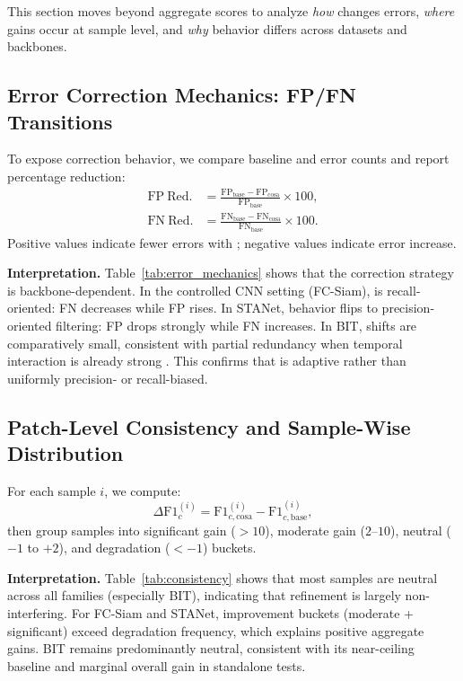 This section moves beyond aggregate scores to analyze \emph{how} \cosa{} changes errors, \emph{where} gains occur at sample level, and \emph{why} behavior differs across datasets and backbones.

\subsection{Error Correction Mechanics: FP/FN Transitions}
To expose correction behavior, we compare baseline and \cosa{} error counts and report percentage reduction:
\begin{equation}
\begin{aligned}
\mathrm{FP\ Red.}&=\frac{\mathrm{FP}_{\text{base}}-\mathrm{FP}_{\text{cosa}}}{\mathrm{FP}_{\text{base}}}\times 100,\\
\mathrm{FN\ Red.}&=\frac{\mathrm{FN}_{\text{base}}-\mathrm{FN}_{\text{cosa}}}{\mathrm{FN}_{\text{base}}}\times 100.
\end{aligned}
\end{equation}
Positive values indicate fewer errors with \cosa{}; negative values indicate error increase.



\noindent\textbf{Interpretation.} Table~\ref{tab:error_mechanics} shows that the correction strategy is backbone-dependent. In the controlled CNN setting (FC-Siam), \cosa{} is recall-oriented: FN decreases while FP rises. In STANet, behavior flips to precision-oriented filtering: FP drops strongly while FN increases. In BIT, shifts are comparatively small, consistent with partial redundancy when temporal interaction is already strong \cite{chen2022bit,w2022,wei2024}. This confirms that \cosa{} is adaptive rather than uniformly precision- or recall-biased.

\subsection{Patch-Level Consistency and Sample-Wise Distribution}
For each sample $i$, we compute:
\begin{equation}
\Delta \mathrm{F1}_c^{(i)} = \mathrm{F1}_{c,\text{cosa}}^{(i)} - \mathrm{F1}_{c,\text{base}}^{(i)},
\end{equation}
then group samples into significant gain ($>10$), moderate gain ($2$--$10$), neutral ($-1$ to $+2$), and degradation ($<-1$) buckets.



\noindent\textbf{Interpretation.} Table~\ref{tab:consistency} shows that most samples are neutral across all families (especially BIT), indicating that refinement is largely non-interfering. For FC-Siam and STANet, improvement buckets (moderate + significant) exceed degradation frequency, which explains positive aggregate gains. BIT remains predominantly neutral, consistent with its near-ceiling baseline and marginal overall gain in standalone tests.

